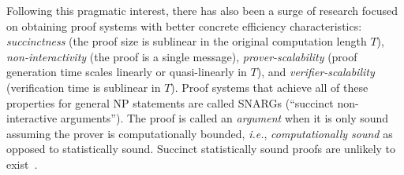 Following this pragmatic interest, there has also been a surge of research focused on obtaining proof systems with better concrete efficiency characteristics: \emph{succinctness} (the proof size is sublinear in the original computation length $T$), \emph{non-interactivity} (the proof is a single message), \emph{prover-scalability} (proof generation time scales linearly or quasi-linearly in $T$), and \emph{verifier-scalability} (verification time is sublinear in $T$). Proof systems that achieve all of these properties for general NP statements%
are called SNARGs (``succinct non-interactive arguments''). 
The proof is called an \emph{argument} when it is only sound assuming the prover is computationally bounded, \emph{i.e.}, \emph{computationally sound} as opposed to statistically sound. 
Succinct statistically sound proofs are unlikely to exist~\cite{CC:GolVadWig02,ICALP:Wee05}.


